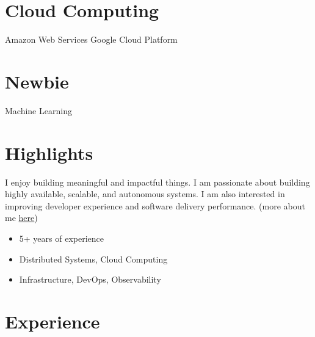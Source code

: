 \documentclass[]{cv-style}                     %
\begin{document}
\begin{aside}
\section{Cloud Computing}
Amazon Web Services
Google Cloud Platform
%
\section{Newbie}
Machine Learning
%
\end{aside}



\section{Highlights}

I enjoy building meaningful and impactful things.
I am passionate about building highly available, scalable, and autonomous systems.
I am also interested in improving developer experience and software delivery performance.
(more about me \href{https://milad.dev/about}{here})

\begin{itemize}
  \setlength{\itemsep}{-4pt}
  \item 5+ years of experience
  \item Distributed Systems, Cloud Computing
  \item Infrastructure, DevOps, Observability
\end{itemize}



\section{Experience}
\end{document}
